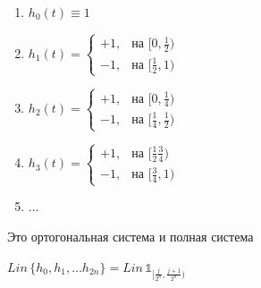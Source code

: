 \begin{example}
\begin{enumerate}
{            \begin{enumerate}
                \item {
                    $h_0 (t) \equiv 1$
                }
                \item {
                    $h_1 (t) = \begin{cases}
                        +1, & \text{на $[0, \frac{1}{2})$} \\
                        -1, & \text{на $[\frac{1}{2}, 1)$}
                    \end{cases}$
                }
                \item {
                    $h_2 (t) = \begin{cases}
                        +1, & \text{на $[0, \frac{1}{4})$} \\
                        -1, & \text{на $[\frac{1}{4}, \frac{1}{2})$}
                    \end{cases}$
                }
                \item {
                    $h_3 (t) = \begin{cases}
                        +1, & \text{на $[\frac{1}{2} \frac{3}{4})$} \\
                        -1, & \text{на $[\frac{3}{4}, 1)$}
                    \end{cases}$
                }
                \item {
                    $\ldots$    
                }
            \end{enumerate}
        }
    \end{enumerate}

    Это ортогональная система и полная система

    $Lin \, \{ h_0, h_1, \ldots h_{2n} \} = Lin \, \mathds{1}_{[\frac{j}{2^n}, \frac{j + 1}{2^n})}$
\end{example}

